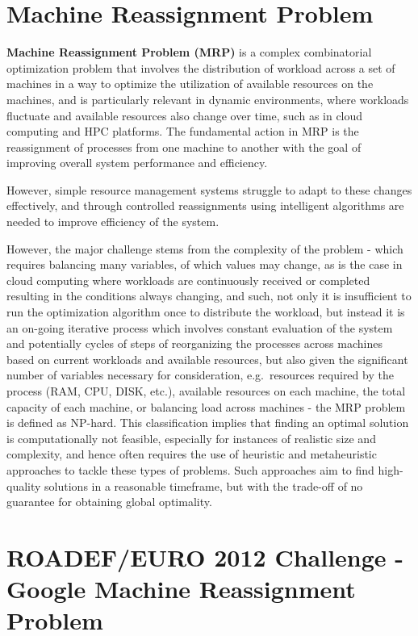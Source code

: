 \documentclass[a4paper,12pt]{Classes/RoboticsLaTeX}
\begin{document}
\section{Machine Reassignment Problem}

\textbf{Machine Reassignment Problem (MRP)} is a complex combinatorial optimization problem that involves the distribution of workload across a set of machines in a way to optimize the utilization of available resources on the machines, and is particularly relevant in dynamic environments, where workloads fluctuate and available resources also change over time, such as in cloud computing and HPC platforms. The fundamental action in MRP is the reassignment of processes from one machine to another with the goal of improving overall system performance and efficiency. 

However, simple resource management systems struggle to adapt to these changes effectively, and through controlled reassignments using intelligent algorithms are needed to improve efficiency of the system.

However, the major challenge stems from the complexity of the problem - which requires balancing many variables, of which values may change, as is the case in cloud computing where workloads are continuously received or completed resulting in the conditions always changing, and such, not only it is insufficient to run the optimization algorithm once to distribute the workload, but instead it is an on-going iterative process which involves constant evaluation of the system and potentially cycles of steps of reorganizing the processes across machines based on current workloads and available resources, but also given the significant number of variables necessary for consideration, e.g.~resources required by the process (RAM, CPU, DISK, etc.), available resources on each machine, the total capacity of each machine, or balancing load across machines - the MRP problem is defined as NP-hard. This classification implies that finding an optimal solution is computationally not feasible, especially for instances of realistic size and complexity, and hence often requires the use of heuristic and metaheuristic approaches to tackle these types of problems. Such approaches aim to find high-quality solutions in a reasonable timeframe, but with the trade-off of no guarantee for obtaining global optimality. \cite{wreford2024}

\section{ROADEF/EURO 2012 Challenge - Google Machine Reassignment Problem}
\end{document}
